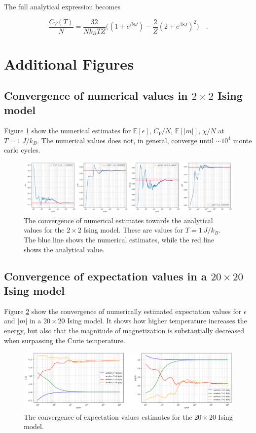 \documentclass[../main_proj4_correct_template.tex]{subfiles}
\begin{document}
\noindent The full analytical expression becomes 

\begin{equation*}
    \frac{C_V(T)}{N} = \frac{32}{Nk_BTZ} \bigg((1+e^{\beta8J}) - \frac{2}{Z}(2+e^{\beta8J})^{2}\bigg) \quad.
\end{equation*}

\newpage
\section{Additional Figures}

\subsection{Convergence of numerical values in $2\times 2$ Ising model}

Figure \ref{fig:p4_appB_p4_convergence} show the numerical estimates for $\mathbb{E}[\epsilon]$, $C_V/N$, $\mathbb{E}[|m|]$, $\chi/N$ at $T = 1~J/k_B$. The numerical values does not, in general, converge until $\sim 10^{4}$ monte carlo cycles. 

\begin{figure}[h!]
    \centering
    \includegraphics[width=0.8\linewidth]{Project 4/figures/p4_convergence.png}
    \caption{The convergence of numerical estimates towards the analytical values for the $2\times 2$ Ising model. These are values for $T=1~J/k_B$. The blue line shows the numerical estimates, while the red line shows the analytical value.}
    \label{fig:p4_appB_p4_convergence}
\end{figure}

\subsection{Convergence of expectation values in a $20\times 20$ Ising model}

Figure \ref{fig:p4_appb_p5_expectation_convergence} show the convergence of numerically estimated expectation values for $\epsilon$ and $|m|$ in a $20\times 20$ Ising model. It shows how higher temperature increases the energy, but also that the magnitude of magnetization is substantially decreased when surpassing the Curie temperature. 

\begin{figure}[h!]
    \centering
    \includegraphics[width=0.8\linewidth]{Project 4/figures/p5_equilibration_expectation.png}
    \caption{The convergence of expectation values estimates for the $20\times 20$ Ising model.}
    \label{fig:p4_appb_p5_expectation_convergence}
\end{figure}
\end{document}
